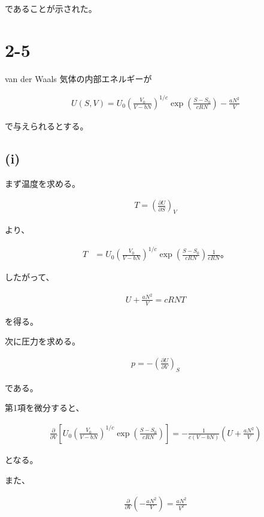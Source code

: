 \documentclass[platex,dvipdfmx,a4paper]{jsarticle}
\begin{document}
であることが示された。
\section{2-5}

van der Waals 気体の内部エネルギーが

\begin{align*}
U(S,V)
=
U_0
\left(
\frac{V_0}{V-bN}
\right)^{1/c}
\exp\left(
\frac{S-S_0}{cRN}
\right)
-\frac{aN^2}{V}
\end{align*}

で与えられるとする。

\subsection{(i)}

まず温度を求める。

\begin{align*}
T
=
\left(
\frac{\partial U}{\partial S}
\right)_V
\end{align*}

より、

\begin{align*}
T
&=
U_0
\left(
\frac{V_0}{V-bN}
\right)^{1/c}
\exp\left(
\frac{S-S_0}{cRN}
\right)
\frac{1}{cRN}。
\end{align*}

したがって、

\begin{align*}
U+\frac{aN^2}{V}
=
cRNT
\end{align*}

を得る。

次に圧力を求める。

\begin{align*}
p
=
-\left(
\frac{\partial U}{\partial V}
\right)_S
\end{align*}

である。

第1項を微分すると、

\begin{align*}
\frac{\partial}{\partial V}
\left[
U_0
\left(
\frac{V_0}{V-bN}
\right)^{1/c}
\exp\left(
\frac{S-S_0}{cRN}
\right)
\right]
=
-\frac{1}{c(V-bN)}
\left(
U+\frac{aN^2}{V}
\right)
\end{align*}

となる。

また、

\begin{align*}
\frac{\partial}{\partial V}
\left(
-\frac{aN^2}{V}
\right)
=
\frac{aN^2}{V^2}
\end{align*}
\end{document}
